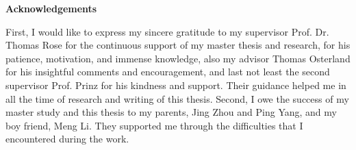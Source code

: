 \thispagestyle{plain}
\vspace*{\fill}
\begin{center}
	\Large
	\textbf{Acknowledgements}
\end{center}

\vspace{1cm}


First, I would like to express my sincere gratitude to my supervisor Prof. Dr. Thomas Rose for the continuous support of my master thesis and research, for his patience, motivation, and immense knowledge, also my advisor Thomas Osterland for his insightful comments and encouragement, and last not least the second supervisor Prof. Prinz for his kindness and support. Their guidance helped me in all the time of research and writing of this thesis.
Second, I owe the success of my master study and this thesis to my parents, Jing Zhou and Ping Yang, and my boy friend, Meng Li. They supported me through the difficulties that I encountered during the work.
\vspace*{\fill}